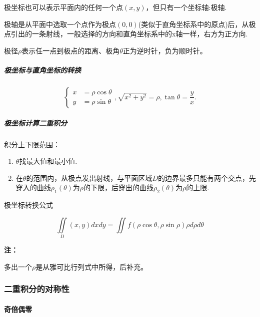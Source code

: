 \documentclass[
]{article}
\begin{document}
极坐标也可以表示平面内的任何一个点\((x,y)\)，但只有一个坐标轴:极轴.

极轴是从平面中选取一个点作为极点\((0,0)\)(类似于直角坐标系中的原点)后，从极点引出的一条射线，一般选择的方向和直角坐标系中的x轴一样，右方为正方向.

极径\(\rho\)表示任一点到极点的距离、极角\(\theta\)正为逆时针，负为顺时针。

\hypertarget{ux6781ux5750ux6807ux4e0eux76f4ux89d2ux5750ux6807ux7684ux8f6cux6362}{%
\subparagraph{极坐标与直角坐标的转换}\label{ux6781ux5750ux6807ux4e0eux76f4ux89d2ux5750ux6807ux7684ux8f6cux6362}}

\[\left \{ 
\begin{aligned} x & = \rho \cos\theta \\y & =\rho \sin\theta \end{aligned} \right.,\sqrt{x^2+y^2}=\rho,\tan\theta = \frac{y}{x}.\]

\hypertarget{ux6781ux5750ux6807ux8ba1ux7b97ux4e8cux91cdux79efux5206-2}{%
\subparagraph{极坐标计算二重积分}\label{ux6781ux5750ux6807ux8ba1ux7b97ux4e8cux91cdux79efux5206-2}}

积分上下限范围：

\begin{enumerate}
\def\labelenumi{\arabic{enumi}.}
\item
  \(\theta \)找最大值和最小值.
\item
  在\(\theta\)的范围内，从极点发出射线，与平面区域\(D\)的边界最多只能有两个交点，先穿入的曲线\(\rho_1(\theta)\)为\(\rho\)的下限，后穿出的曲线\(\rho_2(\theta)\)为\(\rho\)的上限.
\end{enumerate}

极坐标转换公式

\[\iint\limits_D(x,y)dxdy = \iint\limits f(\rho\cos\theta,\rho\sin\rho)\rho d\rho d\theta\]

\textbf{注：}

多出一个\(\rho\)是从雅可比行列式中所得，后补充。

\hypertarget{ux4e8cux91cdux79efux5206ux7684ux5bf9ux79f0ux6027}{%
\subsubsection{二重积分的对称性}\label{ux4e8cux91cdux79efux5206ux7684ux5bf9ux79f0ux6027}}

\hypertarget{ux5947ux500dux5076ux96f6}{%
\paragraph{奇倍偶零}\label{ux5947ux500dux5076ux96f6}}
\end{document}
